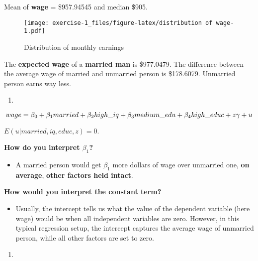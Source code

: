 \documentclass[
  12pt,
]{article}
\providecommand{\tightlist}{%
  \setlength{\itemsep}{0pt}\setlength{\parskip}{0pt}}
\begin{document}
Mean of \textbf{wage} = \$957.94545 and median \$905.

\begin{figure}
\centering
\texttt{[image: exercise-1\_files/figure-latex/distribution of wage-1.pdf]}
\caption{Distribution of monthly earnings}
\end{figure}

The \textbf{expected wage} of a \textbf{married man} is \$977.0479. The
difference between the average wage of married and unmarried person is
\$178.6079. Unmarried person earns way less.

\begin{enumerate}
\def\labelenumi{(\alph{enumi})}
\setcounter{enumi}{2}
\tightlist
\item
  \textbf{\color{red}{Consider the following equation for men under the assumption that all explanatory variables are exogenous}}
\end{enumerate}

\begin{equation}
wage = \beta_0 + \beta_1married + \beta_2high\_iq + \beta_3medium\_edu + \beta_4high\_educ + z\gamma + u\\
\label{mod.1}
\end{equation}

\(E(u|married, iq, educ, z)=0\).

\textbf{How do you interpret \(\beta_1\)?}

\begin{itemize}
\tightlist
\item
  A married person would get \(\beta_1\) more dollars of wage over
  unmarried one, \textbf{on average}, \textbf{other factors held
  intact}.
\end{itemize}

\textbf{How would you interpret the constant term?}

\begin{itemize}
\tightlist
\item
  Usually, the intercept tells us what the value of the dependent
  variable (here wage) would be when all independent variables are zero.
  However, in this typical regression setup, the intercept captures the
  average wage of unmarried person, while all other factors are set to
  zero.
\end{itemize}

\begin{enumerate}
\def\labelenumi{(\alph{enumi})}
\setcounter{enumi}{3}
\item
  \color{red}{Run the regression and interpret the regression coefficients. Include all education dummies to the regression model. Why does Stata drop one of the dummies? How does the interpretation of the constant change if you change the included education dummies?}
\end{enumerate}
\end{document}
